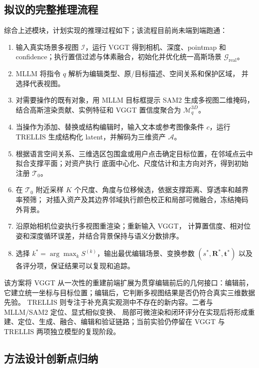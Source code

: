 \subsection{拟议的完整推理流程}

综合上述模块，计划实现的推理过程如下；该流程目前尚未端到端跑通：

\begin{enumerate}[label=\textbf{步骤 \arabic*:}, leftmargin=3.2em]
  \item 输入真实场景多视图 $\mathcal{I}$，运行 VGGT 得到相机、深度、pointmap 和
  confidence；执行置信过滤与体素融合，初始化并优化统一高斯场景
  $\mathcal G_{\mathrm{real}}$。
  \item MLLM 将指令 $q$ 解析为编辑类型、原/目标描述、空间关系和保护区域，
  并选择代表视图。
  \item 对需要操作的既有对象，用 MLLM 目标框提示 SAM2 生成多视图二维掩码，
  结合高斯渲染贡献、实例特征和 VGGT 置信度聚合为 $\mathcal M_q^{3D}$。
  \item 当操作为添加、替换或结构编辑时，输入文本或参考图像条件 $c$，运行 TRELLIS
  生成结构化 latent，并解码为三维资产 $\mathcal A$。
  \item 根据语言空间关系、三维选区包围盒或用户点击确定目标位置，在邻域点云中拟合支撑平面；对资产执行
  底面中心化、尺度估计和主方向对齐，得到初始注册 $\mathcal{T}_0$。
  \item 在 $\mathcal{T}_0$ 附近采样 $K$ 个尺度、角度与位移候选，依据支撑距离、穿透率和越界率预筛；
  对插入资产及其边界邻域执行颜色校正和局部可微融合，冻结掩码外背景。
  \item 沿原始相机位姿执行多视图重渲染；重新输入 VGGT，
  计算置信度、相对位姿和深度循环误差，并结合背景保持与语义分数排序。
  \item 选择 $k^{*}=\arg\max_k S^{(k)}$，输出最优编辑场景、变换参数
  $(s^{*},\mathbf{R}^{*},\mathbf{t}^{*})$ 以及各评分项，保证结果可以复现和追踪。
\end{enumerate}

该方案将 VGGT 从一次性的重建前端扩展为贯穿编辑前后的几何接口：编辑前，
它建立统一坐标与目标位置；编辑后，它判断多视图结果是否仍符合真实三维数据先验。
TRELLIS 则专注于补充真实观测中不存在的新内容。二者与 MLLM/SAM2 定位、显式相似变换、
局部可微渲染和闭环评分在实现后将形成重建、定位、生成、融合、编辑和验证链路；当前实验仍停留在 VGGT 与 TRELLIS 两项独立模型的复现阶段。

\subsection{方法设计创新点归纳}

